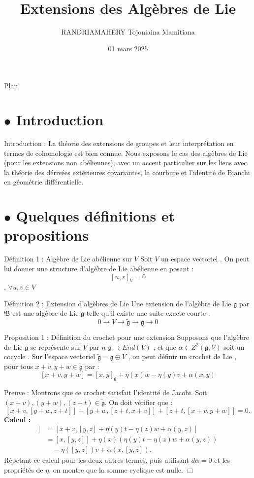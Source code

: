 \documentclass{beamer}
\title{Extensions des Algèbres de Lie}
\author{RANDRIAMAHERY Tojoniaina Mamitiana}
\date{01 mars 2025}
\begin{document}
	
	\frame{\titlepage}
	\begin{frame}{Plan}
		\tableofcontents
	\end{frame}
	\section{$\bullet$ Introduction}
		\begin{frame}{Introduction :}
		La théorie des extensions de groupes et leur interprétation en termes de cohomologie est bien connue. Nous exposons le cas des algèbres de Lie (pour les extensions non abéliennes), avec un accent particulier sur les liens avec la théorie des dérivées extérieures covariantes, la courbure et l'identité de Bianchi en géométrie différentielle.
	\end{frame}
	\section{$\bullet$ Quelques définitions et propositions}
		\begin{frame}{Définition 1 : Algèbre de Lie abélienne sur $ V $}
		Soit $ V $ un espace vectoriel . On peut lui donner une structure d'algèbre de Lie abélienne en posant :
		$$[u,v]_{V}=0$$ , $ \forall u,v\in V$
	\end{frame}
	\begin{frame}{Définition 2 : Extension d'algèbres de Lie}
		Une extension de l'algèbre de Lie $ \mathfrak{g} $ par $\mathfrak{B}$ est une algèbre de Lie $ \tilde{\mathfrak{g}} $ telle qu'il existe une suite exacte courte :
		$$ 0\rightarrow V\rightarrow \tilde{\mathfrak{g}}\rightarrow\mathfrak{g}\rightarrow0$$ 
	\end{frame}
	\begin{frame}{Proposition 1 : Définition du crochet pour une extension}
		Supposons que l'algèbre de Lie $ \mathfrak{g} $ se représente sur $ V $ par $ \eta:\mathfrak{g}\rightarrow End(V) $ , et que $ \alpha\in Z^{2}(\mathfrak{g},V) $ soit un cocycle .
		Sur l'espace vectoriel $\tilde{\mathfrak{g}}=\mathfrak{g}\oplus V$ , on peut définir un crochet de Lie , pour tous $ x+v ,y+w\in \tilde{\mathfrak{g}} $ par :
		$$[x+v,y+w]=[x,y]_{\mathfrak{g}}+\eta(x)w-\eta(y)v+\alpha(x,y)  $$
	\end{frame}
	\begin{frame}{Preuve :}
		Montrons que ce crochet satisfait l’identit\'e de Jacobi. Soit \((x + v), (y + w), (z + t) \in \mathfrak{\tilde{g}}\). On doit v\'erifier que :
		$$
		[x + v, [y + w, z + t]] + [y + w, [z + t, x + v]] + [z + t, [x + v, y + w]] = 0.
		$$
		\textbf{Calcul :}
		\begin{align*}
			[x + v, [y + w, z + t]] & = [x + v, [y, z] + \eta(y)t - \eta(z)w + \alpha(y, z)] \\
			& = [x, [y, z]] + \eta(x)(\eta(y)t - \eta(z)w + \alpha(y, z)) \\
			& \quad  - \eta([y, z])v + \alpha(x, [y, z]).
		\end{align*}
		Répétant ce calcul pour les deux autres termes, puis utilisant $d\alpha = 0$ et les propriétés de $\eta$, on montre que la somme cyclique est nulle. $\Box$
	\end{frame}
\end{document}
